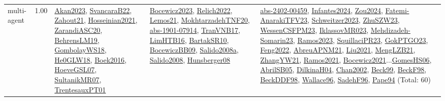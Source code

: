 {\begin{longtable}{p{3cm}r>{\raggedright\arraybackslash}p{6cm}>{\raggedright\arraybackslash}p{6cm}>{\raggedright\arraybackslash}p{8cm}}
\index{multi-agent}\index{Concepts!multi-agent}multi-agent &  1.00 & \hyperref[detail:Akan2023]{Akan2023}, \hyperref[detail:SvancaraB22]{SvancaraB22}, \hyperref[detail:Zahout21]{Zahout21}, \hyperref[detail:Hosseinian2021]{Hosseinian2021}, \hyperref[detail:ZarandiASC20]{ZarandiASC20}, \hyperref[detail:BehrensLM19]{BehrensLM19}, \hyperref[detail:GombolayWS18]{GombolayWS18}, \hyperref[detail:He0GLW18]{He0GLW18}, \hyperref[detail:Boek2016]{Boek2016}, \hyperref[detail:HoeveGSL07]{HoeveGSL07}, \hyperref[detail:SultanikMR07]{SultanikMR07}, \hyperref[detail:TrentesauxPT01]{TrentesauxPT01} & \hyperref[detail:Bocewicz2023]{Bocewicz2023}, \hyperref[detail:Relich2022]{Relich2022}, \hyperref[detail:Lemos21]{Lemos21}, \hyperref[detail:MokhtarzadehTNF20]{MokhtarzadehTNF20}, \hyperref[detail:abs-1901-07914]{abs-1901-07914}, \hyperref[detail:TranVNB17]{TranVNB17}, \hyperref[detail:LimHTB16]{LimHTB16}, \hyperref[detail:BartakSR10]{BartakSR10}, \hyperref[detail:BocewiczBB09]{BocewiczBB09}, \hyperref[detail:Salido2008a]{Salido2008a}, \hyperref[detail:Salido2008]{Salido2008}, \hyperref[detail:Hunsberger08]{Hunsberger08} & \hyperref[detail:abs-2402-00459]{abs-2402-00459}, \hyperref[detail:Infantes2024]{Infantes2024}, \hyperref[detail:Zou2024]{Zou2024}, \hyperref[detail:Fatemi-AnarakiTFV23]{Fatemi-AnarakiTFV23}, \hyperref[detail:Schweitzer2023]{Schweitzer2023}, \hyperref[detail:ZhuSZW23]{ZhuSZW23}, \hyperref[detail:WessenCSFPM23]{WessenCSFPM23}, \hyperref[detail:IklassovMR023]{IklassovMR023}, \hyperref[detail:Mehdizadeh-Somarin23]{Mehdizadeh-Somarin23}, \hyperref[detail:Ramos2023]{Ramos2023}, \hyperref[detail:SquillaciPR23]{SquillaciPR23}, \hyperref[detail:GokPTGO23]{GokPTGO23}, \hyperref[detail:Feng2022]{Feng2022}, \hyperref[detail:AbreuAPNM21]{AbreuAPNM21}, \hyperref[detail:Liu2021]{Liu2021}, \hyperref[detail:MengLZB21]{MengLZB21}, \hyperref[detail:ZhangYW21]{ZhangYW21}, \hyperref[detail:Ramos2021]{Ramos2021}, \hyperref[detail:Bocewicz2021]{Bocewicz2021}...\hyperref[detail:GomesHS06]{GomesHS06}, \hyperref[detail:AbrilSB05]{AbrilSB05}, \hyperref[detail:DilkinaH04]{DilkinaH04}, \hyperref[detail:Chan2002]{Chan2002}, \hyperref[detail:Beck99]{Beck99}, \hyperref[detail:BeckF98]{BeckF98}, \hyperref[detail:BeckDDF98]{BeckDDF98}, \hyperref[detail:Wallace96]{Wallace96}, \hyperref[detail:SadehF96]{SadehF96}, \hyperref[detail:Pape94]{Pape94} (Total: 60)\\

\end{longtable}}
